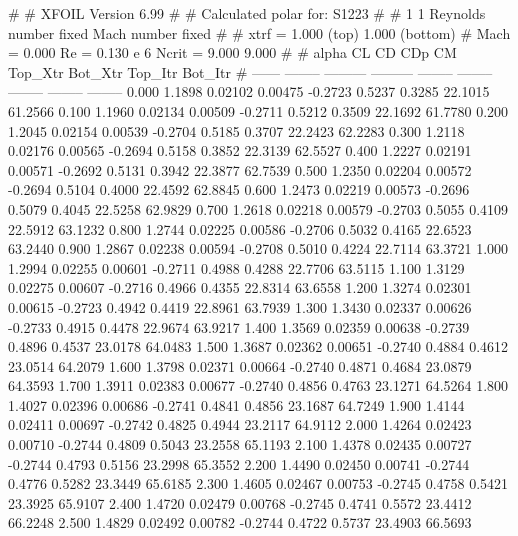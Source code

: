 #  
#       XFOIL         Version 6.99
#  
# Calculated polar for: S1223                                           
#  
# 1 1 Reynolds number fixed          Mach number fixed         
#  
# xtrf =   1.000 (top)        1.000 (bottom)  
# Mach =   0.000     Re =     0.130 e 6     Ncrit =   9.000  9.000
#  
#   alpha    CL        CD       CDp       CM     Top_Xtr  Bot_Xtr  Top_Itr  Bot_Itr
#  ------ -------- --------- --------- -------- -------- -------- -------- --------
   0.000   1.1898   0.02102   0.00475  -0.2723   0.5237   0.3285  22.1015  61.2566
   0.100   1.1960   0.02134   0.00509  -0.2711   0.5212   0.3509  22.1692  61.7780
   0.200   1.2045   0.02154   0.00539  -0.2704   0.5185   0.3707  22.2423  62.2283
   0.300   1.2118   0.02176   0.00565  -0.2694   0.5158   0.3852  22.3139  62.5527
   0.400   1.2227   0.02191   0.00571  -0.2692   0.5131   0.3942  22.3877  62.7539
   0.500   1.2350   0.02204   0.00572  -0.2694   0.5104   0.4000  22.4592  62.8845
   0.600   1.2473   0.02219   0.00573  -0.2696   0.5079   0.4045  22.5258  62.9829
   0.700   1.2618   0.02218   0.00579  -0.2703   0.5055   0.4109  22.5912  63.1232
   0.800   1.2744   0.02225   0.00586  -0.2706   0.5032   0.4165  22.6523  63.2440
   0.900   1.2867   0.02238   0.00594  -0.2708   0.5010   0.4224  22.7114  63.3721
   1.000   1.2994   0.02255   0.00601  -0.2711   0.4988   0.4288  22.7706  63.5115
   1.100   1.3129   0.02275   0.00607  -0.2716   0.4966   0.4355  22.8314  63.6558
   1.200   1.3274   0.02301   0.00615  -0.2723   0.4942   0.4419  22.8961  63.7939
   1.300   1.3430   0.02337   0.00626  -0.2733   0.4915   0.4478  22.9674  63.9217
   1.400   1.3569   0.02359   0.00638  -0.2739   0.4896   0.4537  23.0178  64.0483
   1.500   1.3687   0.02362   0.00651  -0.2740   0.4884   0.4612  23.0514  64.2079
   1.600   1.3798   0.02371   0.00664  -0.2740   0.4871   0.4684  23.0879  64.3593
   1.700   1.3911   0.02383   0.00677  -0.2740   0.4856   0.4763  23.1271  64.5264
   1.800   1.4027   0.02396   0.00686  -0.2741   0.4841   0.4856  23.1687  64.7249
   1.900   1.4144   0.02411   0.00697  -0.2742   0.4825   0.4944  23.2117  64.9112
   2.000   1.4264   0.02423   0.00710  -0.2744   0.4809   0.5043  23.2558  65.1193
   2.100   1.4378   0.02435   0.00727  -0.2744   0.4793   0.5156  23.2998  65.3552
   2.200   1.4490   0.02450   0.00741  -0.2744   0.4776   0.5282  23.3449  65.6185
   2.300   1.4605   0.02467   0.00753  -0.2745   0.4758   0.5421  23.3925  65.9107
   2.400   1.4720   0.02479   0.00768  -0.2745   0.4741   0.5572  23.4412  66.2248
   2.500   1.4829   0.02492   0.00782  -0.2744   0.4722   0.5737  23.4903  66.5693
